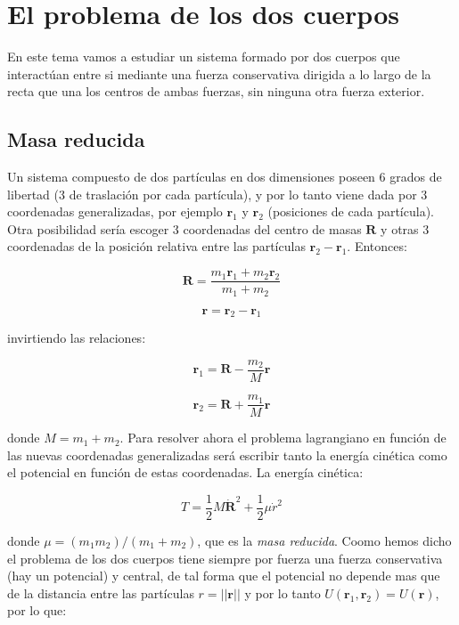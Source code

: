 \documentclass[12pt,a4paper]{book}
\newcommand{\rn}{\mathbf{r}}
\newcommand{\Rn}{\mathbf{R}}
\begin{document}
\section{El problema de los dos cuerpos}

En este tema vamos a estudiar un sistema formado por dos cuerpos que interactúan entre si mediante una fuerza conservativa dirigida a lo largo de la recta que una los centros de ambas fuerzas, sin ninguna otra fuerza exterior. 

\subsection{Masa reducida}

Un sistema compuesto de dos partículas en dos dimensiones poseen 6 grados de libertad (3 de traslación por cada partícula), y por lo tanto viene dada por 3 coordenadas generalizadas, por ejemplo $\rn_1$ y $\rn_2$ (posiciones de cada partícula). Otra posibilidad sería escoger 3 coordenadas del centro de masas $\Rn$ y otras 3 coordenadas de la posición relativa entre las partículas $\rn_2 - \rn_1$. Entonces:

\begin{equation}
\Rn = \dfrac{m_1 \rn_1 + m_2 \rn_2}{m_1 + m_2}
\end{equation}

\begin{equation}
\rn = \rn_2 - \rn_1
\end{equation}

invirtiendo las relaciones:

\begin{equation}
\rn_1 = \Rn - \dfrac{m_2}{M} \rn
\end{equation}

\begin{equation}
\rn_2 = \Rn + \dfrac{m_1}{M} \rn
\end{equation}


donde $M=m_1+m_2$. Para resolver ahora el problema lagrangiano en función de las nuevas coordenadas generalizadas será escribir tanto la energía cinética como el potencial en función de estas coordenadas. La energía cinética:

\begin{equation}
T = \frac{1}{2} M \dot{\Rn}^2 + \dfrac{1}{2} \mu \dot{r}^2
\end{equation}

donde $\mu = (m_1 m_2)/(m_1+m_2)$, que es la \textit{masa reducida}. Coomo hemos dicho el problema de los dos cuerpos tiene siempre por fuerza una fuerza conservativa (hay un potencial) y central, de tal forma que el potencial no depende mas que de la distancia entre las partículas $r = || \rn ||$ y por lo tanto $U(\rn_1,\rn_2) = U (\rn)$, por lo que:
\end{document}
